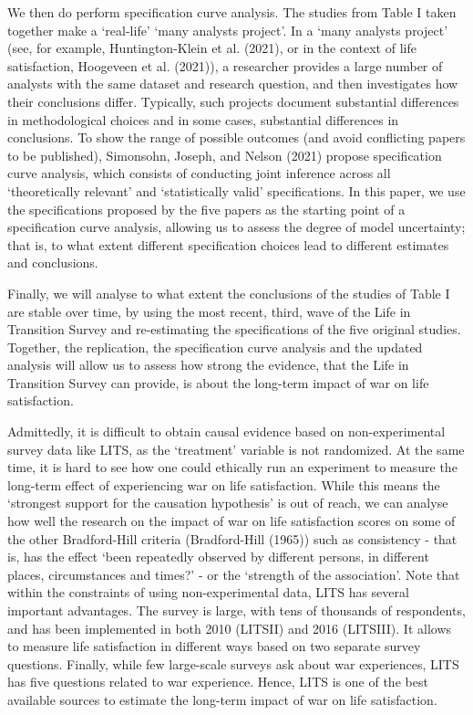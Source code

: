 \documentclass[
  letterpaper,
  DIV=11,
  numbers=noendperiod]{scrartcl}
\begin{document}
We then do perform specification curve analysis. The studies from Table
I taken together make a `real-life' `many analysts project'. In a `many
analysts project' (see, for example, Huntington-Klein et al. (2021), or
in the context of life satisfaction, Hoogeveen et al. (2021)), a
researcher provides a large number of analysts with the same dataset and
research question, and then investigates how their conclusions differ.
Typically, such projects document substantial differences in
methodological choices and in some cases, substantial differences in
conclusions. To show the range of possible outcomes (and avoid
conflicting papers to be published), Simonsohn, Joseph, and Nelson
(2021) propose specification curve analysis, which consists of
conducting joint inference across all `theoretically relevant' and
`statistically valid' specifications. In this paper, we use the
specifications proposed by the five papers as the starting point of a
specification curve analysis, allowing us to assess the degree of model
uncertainty; that is, to what extent different specification choices
lead to different estimates and conclusions.

Finally, we will analyse to what extent the conclusions of the studies
of Table I are stable over time, by using the most recent, third, wave
of the Life in Transition Survey and re-estimating the specifications of
the five original studies. Together, the replication, the specification
curve analysis and the updated analysis will allow us to assess how
strong the evidence, that the Life in Transition Survey can provide, is
about the long-term impact of war on life satisfaction.

Admittedly, it is difficult to obtain causal evidence based on
non-experimental survey data like LITS, as the `treatment' variable is
not randomized. At the same time, it is hard to see how one could
ethically run an experiment to measure the long-term effect of
experiencing war on life satisfaction. While this means the `strongest
support for the causation hypothesis' is out of reach, we can analyse
how well the research on the impact of war on life satisfaction scores
on some of the other Bradford-Hill criteria (Bradford-Hill (1965)) such
as consistency - that is, has the effect `been repeatedly observed by
different persons, in different places, circumstances and times?' - or
the `strength of the association'. Note that within the constraints of
using non-experimental data, LITS has several important advantages. The
survey is large, with tens of thousands of respondents, and has been
implemented in both 2010 (LITSII) and 2016 (LITSIII). It allows to
measure life satisfaction in different ways based on two separate survey
questions. Finally, while few large-scale surveys ask about war
experiences, LITS has five questions related to war experience. Hence,
LITS is one of the best available sources to estimate the long-term
impact of war on life satisfaction.
\end{document}
